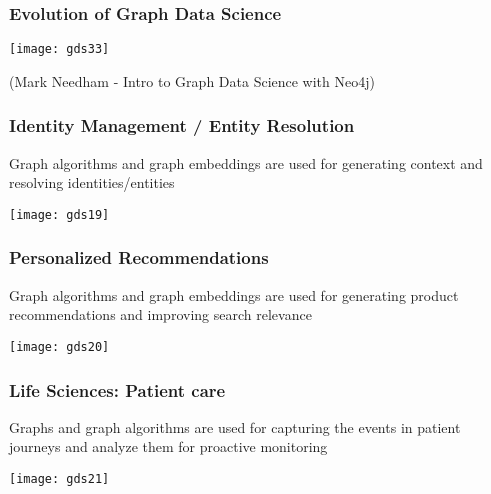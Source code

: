 \begin{frame}[fragile]\frametitle{Evolution of Graph Data Science}

\begin{center}
\texttt{[image: gds33]}

{\tiny (Mark Needham - Intro to Graph Data Science with Neo4j)}

\end{center}

\end{frame}


\begin{frame}[fragile]\frametitle{Identity Management / Entity Resolution}

Graph algorithms and graph embeddings are used for generating context and resolving identities/entities


\begin{center}
\texttt{[image: gds19]}
\end{center}

\end{frame}

\begin{frame}[fragile]\frametitle{Personalized Recommendations}

Graph algorithms and graph embeddings are used for generating product recommendations and improving search relevance


\begin{center}
\texttt{[image: gds20]}
\end{center}

\end{frame}

\begin{frame}[fragile]\frametitle{Life Sciences: Patient care}

Graphs and graph algorithms are used for capturing the events in patient journeys and analyze them for proactive monitoring


\begin{center}
\texttt{[image: gds21]}
\end{center}

\end{frame}

